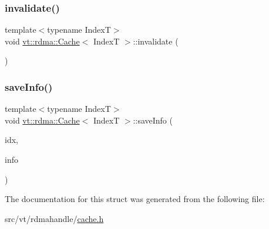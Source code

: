 \subsubsection{\texorpdfstring{invalidate()}{invalidate()}}
{\footnotesize\ttfamily template$<$typename IndexT$>$ \\
void \hyperlink{structvt_1_1rdma_1_1_cache}{vt\+::rdma\+::\+Cache}$<$ IndexT $>$\+::invalidate (\begin{DoxyParamCaption}{ }\end{DoxyParamCaption})\hspace{0.3cm}{\ttfamily [inline]}}

\mbox{\label{structvt_1_1rdma_1_1_cache_ab8f9bc1877a3be2f277e7280f3db1075}} 
\subsubsection{\texorpdfstring{save\+Info()}{saveInfo()}}
{\footnotesize\ttfamily template$<$typename IndexT$>$ \\
void \hyperlink{structvt_1_1rdma_1_1_cache}{vt\+::rdma\+::\+Cache}$<$ IndexT $>$\+::save\+Info (\begin{DoxyParamCaption}\item[{IndexT const \&}]{idx,  }\item[{\hyperlink{structvt_1_1rdma_1_1_index_info}{Index\+Info}}]{info }\end{DoxyParamCaption})\hspace{0.3cm}{\ttfamily [inline]}}



The documentation for this struct was generated from the following file\+:\begin{DoxyCompactItemize}
\item 
src/vt/rdmahandle/\hyperlink{rdmahandle_2cache_8h}{cache.\+h}\end{DoxyCompactItemize}
